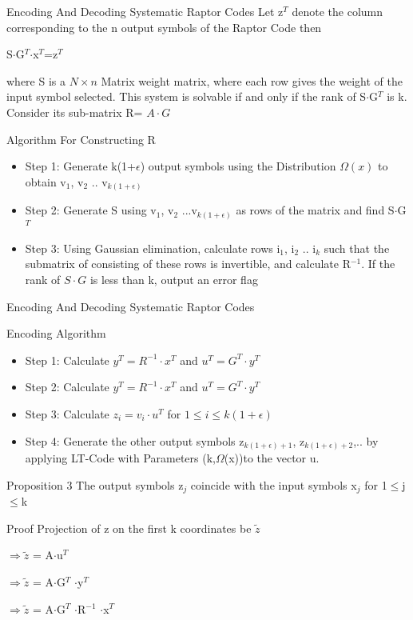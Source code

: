 \documentclass[handout,11pt]{beamer}
\begin{document}
\begin{frame}{ Encoding And Decoding Systematic Raptor Codes}
Let z$^T$ denote the column corresponding to the n output symbols of the Raptor Code then

S$\cdot$G$^T$$\cdot$x$^T$=z$^T$ 

where S is a $N\times n$ Matrix weight matrix, where each row gives the weight of the input symbol selected. This system is solvable if and only if the rank of S$\cdot$G$^T$ is k. Consider its sub-matrix R= $A\cdot G$
\begin{block}{Algorithm For Constructing R}
\begin{itemize}
\item Step 1: Generate k(1+$\epsilon$) output symbols using the Distribution $\Omega(x)$ to obtain v$_1$, v$_2$ .. v$_{k(1+\epsilon)}$
\item Step 2: Generate S using v$_1$, v$_2$ ...v$_{k(1+\epsilon)}$ as rows of the matrix and find S$\cdot$G$^T$
\item Step 3: Using Gaussian elimination, calculate rows i$_1$, i$_2$ .. i$_k$
such that the submatrix of consisting of these
rows is invertible, and calculate R$^{-1}$. If the rank of $S\cdot G$
is less than k, output an error flag
\end{itemize}


\end{block}
\end{frame}

\begin{frame}{Encoding And Decoding Systematic Raptor Codes}
\begin{block}{Encoding Algorithm}
  \begin{itemize}
\item Step 1: Calculate $y^T = R^{-1}\cdot x^T$ and $u^T = G^T \cdot y^T$
\item Step 2: Calculate $y^T = R^{-1}\cdot x^T$ and $u^T = G^T \cdot y^T$
\item Step 3: Calculate $z_i = v_i \cdot u^T$  for $1\le i \le k(1+\epsilon)$
\item Step 4: Generate the other output symbols z$_{k(1+\epsilon)+1}$, z$_{k(1+\epsilon)+2}$,.. by applying LT-Code with Parameters (k,$\Omega$(x))to the vector u.
\end{itemize}
\end{block}
\begin{block}{Proposition 3}
The output symbols z$_j$ coincide with the input symbols x$_j$ for 1$\le$j$\le$k
\end{block}
\begin{block}{Proof}
Projection of z on the first k coordinates be $\tilde{z}$

$\Rightarrow \tilde{z}$ = A$\cdot$u$^T$ 

$\Rightarrow \tilde{z}$ = A$\cdot$G$^T$ $\cdot$y$^T$

$\Rightarrow \tilde{z}$ = A$\cdot$G$^T$ $\cdot$R$^{-1}$ $\cdot$x$^{T}$
\end{block}
\end{frame}
\end{document}
